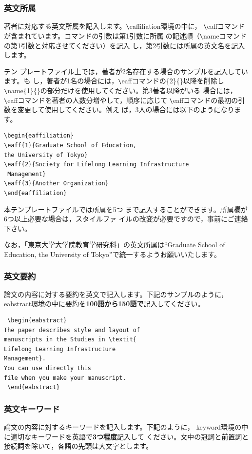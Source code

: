 \documentclass[b5paper,10pt,twocolumn,tombow]{jarticle}
\begin{document}
\subsubsection{英文所属}
著者に対応する英文所属を記入します。\verb|\|eaffiliation環境の中に，
\verb|\|eaffコマンドが含まれています。コマンドの引数は第1引数に所属
の記述順（\verb|\|nameコマンドの第1引数と対応させてください）を記入
し，第2引数には所属の英文名を記入します。


テン
プレートファイル上では，著者が2名存在する場合のサンプルを記入しています。も
し，著者が1名の場合には，\verb|\|eaffコマンドの\{2\}\{\}以降を削除し
\verb|\|name\{1\}\{\}の部分だけを使用してください。第3著者以降がいる
場合には，\verb|\|eaffコマンドを著者の人数分増やして，順序に応じて
\verb|\|eaffコマンドの最初の引数を変更して使用してください。例え
ば，3人の場合には以下のようになります。

\begin{verbatim}
\begin{eaffiliation}
\eaff{1}{Graduate School of Education,
the University of Tokyo}
\eaff{2}{Society for Lifelong Learning Infrastructure
 Management}
\eaff{3}{Another Organization}
\end{eaffiliation}
\end{verbatim}
本テンプレートファイルでは所属を5つ
まで記入することができます。所属欄が6つ以上必要な場合は，スタイルファ
イルの改変が必要ですので，事前にご連絡下さい。

なお，「東京大学大学院教育学研究科」の英文所属は``Graduate School of
Education, the University of
Tokyo''で統一するようお願いいたします。

\subsubsection{英文要約}
論文の内容に対する要約を英文で記入します。下記のサンプルのように，
eabstract環境の中に要約を\textbf{100語から150語で}記入してください。


\begin{verbatim}
 \begin{eabstract}
The paper describes style and layout of
manuscripts in the Studies in \textit{
Lifelong Learning Infrastructure
Management}.
You can use directly this
file when you make your manuscript.
 \end{eabstract}

\end{verbatim}


\subsubsection{英文キーワード}
論文の内容に対するキーワードを記入します。下記のように，
keyword環境の中に適切なキーワードを英語で\textbf{3つ程度}記入して
ください。文中の冠詞と前置詞と接続詞を除いて，各語の先頭は大文字とします。
\end{document}
